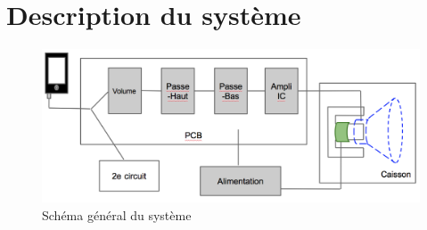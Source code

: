 \section{Description du système}

\begin{figure}	
\begin{center}
\includegraphics[width=\textwidth]{img/schemacomplet} 
\end{center}
\caption{Schéma général du système}		
\label{fig:schemacomplet}		
\end{figure}

